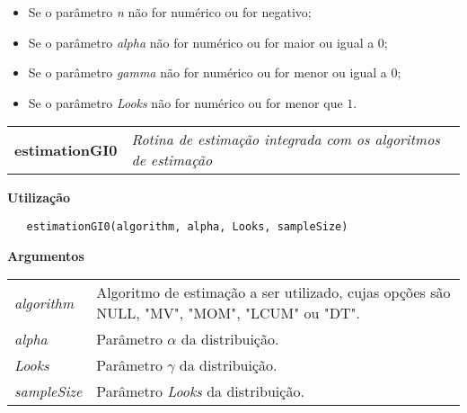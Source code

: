 \begin{itemize}
    \item Se o parâmetro \textit{n} não for numérico ou for negativo;
    \item Se o parâmetro \textit{alpha} não for numérico ou for maior ou igual a $0$;
    \item Se o parâmetro \textit{gamma} não for numérico ou for menor ou igual a $0$;
    \item Se o parâmetro \textit{Looks} não for numérico ou for menor que $1$.
\end{itemize}

\newpage


\hrulefill   

\begin{table}[!ht]
\begin{center}
\begin{tabularx}{\textwidth}{ X X}
\hspace{0.5cm} \textbf{estimationGI0} & \textit{Rotina de estimação integrada com os algoritmos de estimação}\\
\end{tabularx}
\end{center}
\end{table} 

\vspace{-0.5cm}
\hrulefill  
\vspace{0.5cm}

\textbf{Utilização}

\begin{lstlisting}
   estimationGI0(algorithm, alpha, Looks, sampleSize)
\end{lstlisting}

\vspace{0.5cm}

\textbf{Argumentos}

\begin{table}[!ht]
\begin{center}
\begin{tabularx}{\textwidth}{X X}
\hspace{0.5cm} \textit{algorithm} & Algoritmo de estimação a ser utilizado, cujas opções são NULL, "MV", "MOM", "LCUM" ou "DT". \\
\hspace{0.5cm} \textit{alpha} & Parâmetro $\alpha$ da distribuição. \\
\hspace{0.5cm} \textit{Looks} & Parâmetro $\gamma$ da distribuição. \\
\hspace{0.5cm} \textit{sampleSize} & Parâmetro \textit{Looks} da distribuição. \\
\end{tabularx}
\end{center}
\end{table} 

